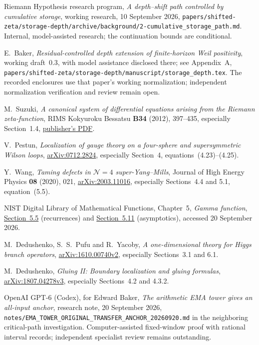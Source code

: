 Riemann Hypothesis research program,
\emph{A depth--shift path controlled by cumulative storage},
working research, 10 September 2026,
\nolinkurl{papers/shifted-zeta/storage-depth/archive/background/2-cumulative_storage_path.md}.
Internal, model-assisted research; the continuation bounds are
conditional.

E.~Baker, \emph{Residual-controlled depth extension of finite-horizon
Weil positivity}, working draft~0.3, with model assistance disclosed
there; see Appendix~A,
\nolinkurl{papers/shifted-zeta/storage-depth/manuscript/storage_depth.tex}.
The recorded enclosures use that paper's working normalization;
independent normalization verification and review remain open.

M.~Suzuki, \emph{A canonical system of differential equations arising
from the Riemann zeta-function}, RIMS Kokyuroku Bessatsu
\textbf{B34} (2012), 397--435, especially Section~1.4,
\href{https://www.kurims.kyoto-u.ac.jp/~kenkyubu/bessatsu/open/B34/pdf/B34_023.pdf}{publisher's PDF}.


V.~Pestun, \emph{Localization of gauge theory on a four-sphere and
supersymmetric Wilson loops},
\href{https://arxiv.org/abs/0712.2824}{arXiv:0712.2824},
especially Section~4, equations~(4.23)--(4.25).

Y.~Wang, \emph{Taming defects in $\mathcal N=4$ super-Yang--Mills},
Journal of High Energy Physics \textbf{08} (2020), 021,
\href{https://arxiv.org/abs/2003.11016}{arXiv:2003.11016},
especially Sections~4.4 and 5.1, equation~(5.5).

NIST Digital Library of Mathematical Functions,
Chapter~5, \emph{Gamma function},
\href{https://dlmf.nist.gov/5.5}{Section~5.5} (recurrences) and
\href{https://dlmf.nist.gov/5.11}{Section~5.11} (asymptotics),
accessed 20 September 2026.

M.~Dedushenko, S.~S.~Pufu and R.~Yacoby,
\emph{A one-dimensional theory for Higgs branch operators},
\href{https://arxiv.org/abs/1610.00740v2}{arXiv:1610.00740v2},
especially Sections~3.1 and 6.1.

M.~Dedushenko, \emph{Gluing II: Boundary localization and gluing formulas},
\href{https://arxiv.org/abs/1807.04278v3}{arXiv:1807.04278v3},
especially Sections~4.2 and 4.3.2.

OpenAI GPT-6 (Codex), for Edward Baker,
\emph{The arithmetic EMA tower gives an all-input anchor},
research note, 20 September 2026,
\nolinkurl{notes/EMA_TOWER_ORIGINAL_TRANSFER_ANCHOR_20260920.md}
in the neighboring critical-path investigation.
Computer-assisted fixed-window proof with rational interval records;
independent specialist review remains outstanding.


